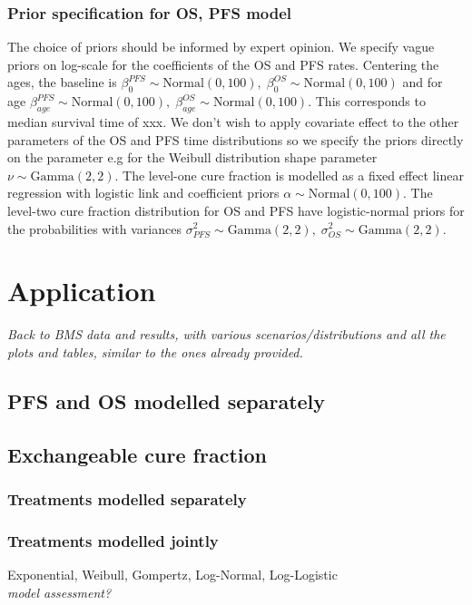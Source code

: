 \documentclass[AMA,STIX1COL]{WileyNJD-v2}
\begin{document}
\subsubsection{Prior specification for OS, PFS model}
The choice of priors should be informed by expert opinion.
We specify vague priors on log-scale for the coefficients of the OS and PFS rates.
Centering the ages, the baseline is $\beta_0^{PFS} \sim \text{Normal}(0, 100),\; \beta_0^{OS} \sim \text{Normal}(0, 100)$ and for age $\beta_{age}^{PFS} \sim \text{Normal}(0, 100),\; \beta_{age}^{OS} \sim \text{Normal}(0, 100)$.
This corresponds to median survival time of xxx.
We don't wish to apply covariate effect to the other parameters of the OS and PFS time distributions so we specify the priors directly on the parameter
e.g for the Weibull distribution shape parameter $\nu \sim \text{Gamma}(2, 2)$. 
The level-one cure fraction is modelled as a fixed effect linear regression with logistic link and coefficient priors $\alpha \sim \text{Normal}(0, 100)$.
The level-two cure fraction distribution for OS and PFS have logistic-normal priors for the probabilities with variances $\sigma^2_{PFS} \sim \text{Gamma}(2, 2),\; \sigma^2_{OS} \sim \text{Gamma}(2, 2)$.



\section{Application}\label{sec:application}

{\it Back to BMS data and results, with various scenarios/distributions and all the plots and tables, similar to the ones already provided.}

\subsection{PFS and OS modelled separately}
\subsection{Exchangeable cure fraction}
\subsubsection{Treatments modelled separately}
\subsubsection{Treatments modelled jointly}

Exponential, Weibull, Gompertz, Log-Normal, Log-Logistic\\
{\it model assessment?}
\end{document}
